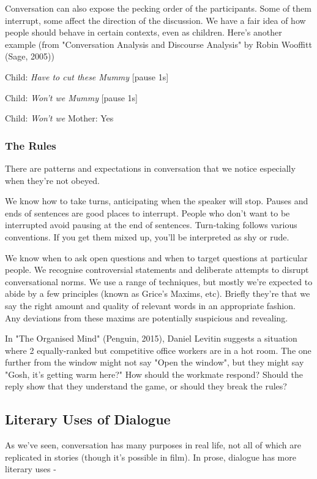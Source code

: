 \documentclass[11pt]{article}
\newenvironment{narrow}[2]{%
 \begin{list}{}{%
  \setlength{\topsep}{0pt}%
  \setlength{\leftmargin}{#1}%
  \setlength{\rightmargin}{#2}%
  \setlength{\listparindent}{\parindent}%
  \setlength{\itemindent}{\parindent}%
  \setlength{\parsep}{\parskip}%
 }%
\item[]}{\end{list}}
\begin{document}
Conversation can also expose the pecking order of the participants. Some of them interrupt, some affect the direction of the discussion. We have a fair idea of how people should behave in certain contexts, even as children. Here's another example (from "Conversation Analysis and Discourse Analysis" by Robin Wooffitt (Sage, 2005))

\begin{narrow}{1.0cm}{1.0cm}
Child:  \textit{Have to cut these Mummy} [pause 1s]

Child:  \textit{Won't we Mummy} [pause 1s]

Child:  \textit{Won't we}
Mother: Yes
\end{narrow}

\subsubsection*{The Rules}
There are patterns and expectations in conversation that we notice especially when they're not obeyed.

We know how to take turns, anticipating when the speaker will stop. Pauses and ends of sentences are good places to interrupt. People who don't want to be interrupted avoid pausing at the end of sentences. Turn-taking follows various conventions. If you get them mixed up, you'll be interpreted as shy or rude. 



We know when to ask open questions and when to target questions at particular people. We recognise controversial statements and deliberate attempts to disrupt conversational norms. We use a range of techniques, but mostly we're expected to abide by a few principles (known as Grice's Maxims, etc). Briefly they're that we say the right amount and quality of relevant words in an appropriate fashion. Any deviations from these maxims are potentially suspicious and revealing.

 

In "The Organised Mind" (Penguin, 2015), Daniel Levitin suggests a situation where 2 equally-ranked but competitive office workers are in a hot room. The one further from the window might not say "Open the window", but they might say "Gosh, it's getting warm here?" How should the workmate respond? Should the reply show that they understand the game, or should they break the rules?


\subsection*{Literary Uses of Dialogue}
As we've seen, conversation has many purposes in real life, not all of which are replicated in stories (though it's possible in film). In prose, dialogue has more literary uses -
\end{document}
